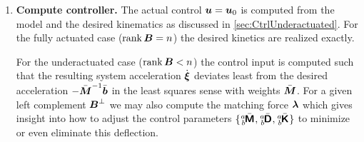 \begin{enumerate}
\item \textbf{Compute controller.}
The actual control $\boldsymbol{u} = \boldsymbol{u}_0$ is computed from the model and the desired kinematics as discussed in \autoref{sec:CtrlUnderactuated}.
For the fully actuated case ($\operatorname{rank}\boldsymbol{B}=n$) the desired kinetics are realized exactly. 

For the underactuated case ($\operatorname{rank}\boldsymbol{B}<n$) the control input is computed such that the resulting system acceleration $\dot{\boldsymbol{\xi}}$ deviates least from the desired acceleration $-\bar{\boldsymbol{M}}^{-1}\bar{\boldsymbol{b}}$ in the least squares sense with weights $\bar{\boldsymbol{M}}$.
For a given left complement $\boldsymbol{B}^\bot$ we may also compute the matching force $\boldsymbol{\lambda}$ which gives insight into how to adjust the control parameters $\{\bodyInertiaMatC{\BidxI}{\BidxII}, \bodyDissMatC{\BidxI}{\BidxII}, \bodyStiffMatC{\BidxI}{\BidxII}\}$ to minimize or even eliminate this deflection.

\end{enumerate}





